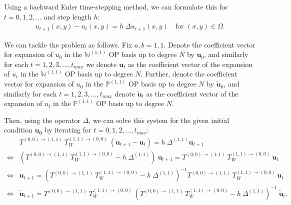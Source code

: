 \documentclass[11pt, oneside]{article}   	%
\newcommand{\Wii}{W^{(1,1)}}
\newcommand{\bigPii}{{\mathbb{P}^{(1,1)}}}
\newcommand{\bigWii}{{\mathbb{W}^{(1,1)}}}
\begin{document}
Using a backward Euler time-stepping method, we can formulate this for \(t = 0,1,2,\dots\) and step length $h$:
\begin{align}
u_{t+1}(x,y) - u_t (x,y) = h \: \Delta u_{t+1}(x,y) \quad \text{for } (x,y) \in \Omega.
\end{align}

We can tackle the problem as follows. Fix \(a, b = 1,1\). Denote the coefficient vector for expansion of $u_0$ in the $\bigWii$ OP basis up to degree $N$ by $\mathbf{u}_0$, and similarly for each $t = 1,2,3,\dots,t_{max}$ we denote $\mathbf{u}_t$ as the coefficient vector of the expansion of $u_t$ in the $\bigWii$ OP basis up to degree $N$. Further, denote the coefficient vector for expansion of $u_0$ in the $\bigPii$ OP basis up to degree $N$ by $\mathbf{\tilde{u}}_0$, and similarly for each $t = 1,2,3,\dots,t_{max}$ denote $\mathbf{\tilde{u}}_t$ as the coefficient vector of the expansion of $u_t$ in the $\bigPii$ OP basis up to degree $N$.

Then, using the operator $\Delta$, we can solve this system for the given initial condition $\mathbf{u_0}$ by iterating for $t = 0,1,2,\dots,t_{max}$:
\begin{align}
	&T^{(0,0)\to(1,1)} \: T_W^{(1,1)\to(0,0)} \: (\mathbf{u}_{t+1} - \mathbf{u}_t) = h \: \Delta^{(1,1)} \mathbf{u}_{t+1} \nonumber \\
	\iff& (T^{(0,0)\to(1,1)} \:T_W^{(1,1)\to(0,0)} - h \: \Delta^{(1,1)}) \: \mathbf{u}_{t+1} = T^{(0,0)\to(1,1)} \: T_W^{(1,1)\to(0,0)} \: \mathbf{u}_t \nonumber \\
	\iff& \mathbf{u}_{t+1} = (T^{(0,0)\to(1,1)} \: T_W^{(1,1)\to(0,0)} - h \: \Delta^{(1,1)})^{-1} T^{(0,0)\to(1,1)} \: T_W^{(1,1)\to(0,0)} \: \mathbf{u}_t \nonumber \\
	\iff& \mathbf{\tilde{u}}_{t+1} = T^{(0,0)\to(1,1)} \: T_W^{(1,1)\to(0,0)} \: (T^{(0,0)\to(1,1)} \: T_W^{(1,1)\to(0,0)} - h \: \Delta^{(1,1)})^{-1} \: \mathbf{\tilde{u}}_t.
\end{align}

\end{document}
